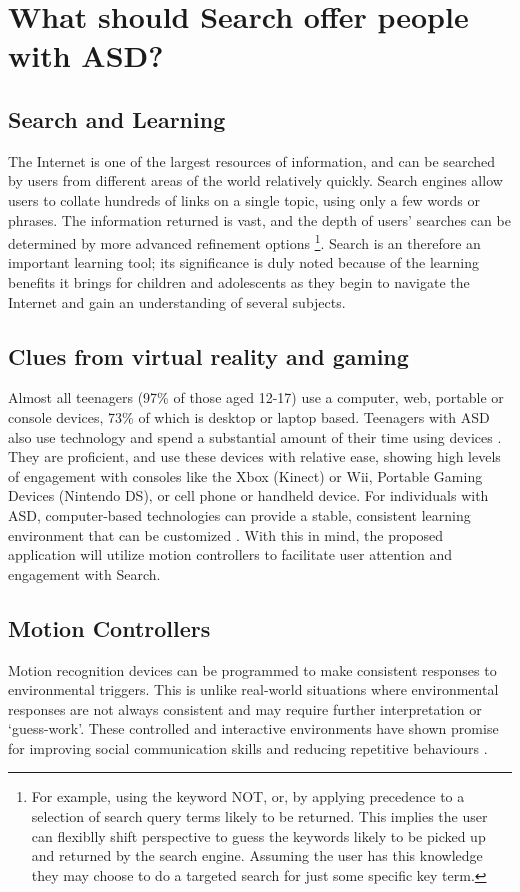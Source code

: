 \documentclass[10pt]{article}
\begin{document}
\section{What should Search offer people with ASD?}\label{What should Search offer people with ASD}
\subsection{Search and Learning}
The Internet is one of the largest resources of information, and can be searched by users from different areas of the world relatively quickly. Search engines allow users to collate hundreds of links on a single topic, using only a few words or phrases. The information returned is vast, and the depth of users’ searches can be determined by more advanced refinement options \footnote{For example, using the keyword NOT, or, by applying precedence to a selection of search query terms likely to be returned. This implies the user can flexiblly shift perspective to guess the keywords likely to be picked up and returned by the search engine. Assuming the user has this knowledge they may choose to do a targeted search for just some specific key term.}. Search is an therefore an important learning tool; its significance is duly noted because of the learning benefits it brings for children and adolescents as they begin to navigate the Internet and gain an understanding of several subjects. 

\subsection{Clues from virtual reality and gaming}
Almost all teenagers (97\% of those aged 12-17) use a computer, web, portable or console devices, 73\% of which is desktop or laptop based. Teenagers with ASD also use technology and spend a substantial amount of their time using devices \cite{Shane and Albert}. They are proficient, and use these devices with relative ease, showing high levels of engagement with consoles like the Xbox (Kinect) or Wii, Portable Gaming Devices (Nintendo DS), or cell phone or handheld device. For individuals with ASD, computer-based technologies can provide a stable, consistent learning environment that can be customized \cite{moore}. With this in mind, the proposed application will utilize motion controllers to facilitate user attention and engagement with Search. 

\subsection{Motion Controllers}
Motion recognition devices can be programmed to make consistent responses to environmental triggers. This is unlike real-world situations where environmental responses are not always consistent and may require further interpretation or ‘guess-work’. These controlled and interactive environments have shown promise for improving social communication skills and reducing repetitive behaviours \cite{gameshealth}.
\end{document}
